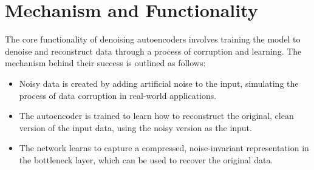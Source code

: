 \documentclass[a4paper,12pt]{article}
\begin{document}
\section{Mechanism and Functionality}

The core functionality of denoising autoencoders involves training the model to denoise and reconstruct data through a process of corruption and learning. The mechanism behind their success is outlined as follows:

\begin{itemize}
    \item Noisy data is created by adding artificial noise to the input, simulating the process of data corruption in real-world applications.
    \item The autoencoder is trained to learn how to reconstruct the original, clean version of the input data, using the noisy version as the input.
    \item The network learns to capture a compressed, noise-invariant representation in the bottleneck layer, which can be used to recover the original data.
\end{itemize}
\end{document}
